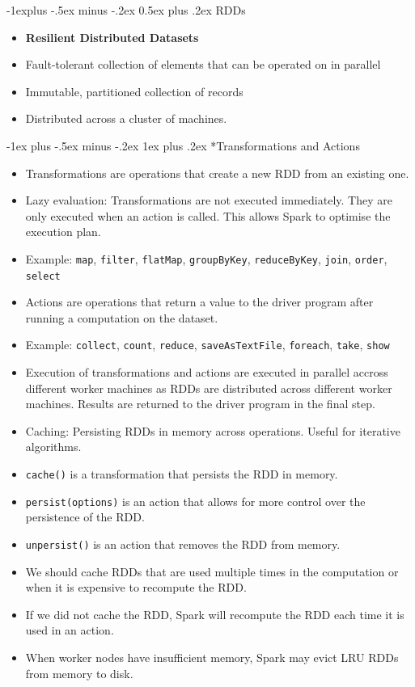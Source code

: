 \documentclass[10pt, landscape]{article}
\makeatletter
\renewcommand{\subsection}{\@startsection{subsection}{2}{0mm}%
  {-1explus -.5ex minus -.2ex}%
  {0.5ex plus .2ex}%
{\normalfont\normalsize\bfseries}}
\renewcommand{\subsubsection}{\@startsection{subsubsection}{3}{0mm}%
  {-1ex plus -.5ex minus -.2ex}%
  {1ex plus .2ex}%
{\normalfont\small\bfseries}}%
\makeatother
\begin{document}
\begin{multicols*}{4}
  \subsection{RDDs}
  \begin{itemize}
    \item \textbf{Resilient Distributed Datasets}
    \item Fault-tolerant collection of elements that can be operated on in parallel
    \item Immutable, partitioned collection of records
    \item Distributed across a cluster of machines.
  \end{itemize}

  \subsubsection*{Transformations and Actions}
  \begin{itemize}
    \item Transformations are operations that create a new RDD from an existing one.
    \item Lazy evaluation: Transformations are not executed immediately. They are only executed when an action is called. This allows Spark to optimise the execution plan.
    \item Example: \texttt{map}, \texttt{filter}, \texttt{flatMap}, \texttt{groupByKey}, \texttt{reduceByKey}, \texttt{join}, \texttt{order}, \texttt{select}
    \item Actions are operations that return a value to the driver program after running a computation on the dataset.
    \item Example: \texttt{collect}, \texttt{count}, \texttt{reduce}, \texttt{saveAsTextFile}, \texttt{foreach}, \texttt{take}, \texttt{show}
    \item Execution of transformations and actions are executed in parallel accross different worker machines as RDDs are distributed across different worker machines. Results are returned to the driver program in the final step.
    \item Caching: Persisting RDDs in memory across operations. Useful for iterative algorithms.
    \item \texttt{cache()} is a transformation that persists the RDD in memory.
    \item \texttt{persist(options)} is an action that allows for more control over the persistence of the RDD.
    \item \texttt{unpersist()} is an action that removes the RDD from memory.
    \item We should cache RDDs that are used multiple times in the computation or when it is expensive to recompute the RDD.
    \item If we did not cache the RDD, Spark will recompute the RDD each time it is used in an action.
    \item When worker nodes have insufficient memory, Spark may evict LRU RDDs from memory to disk.
  \end{itemize}


\end{multicols*}
\end{document}

